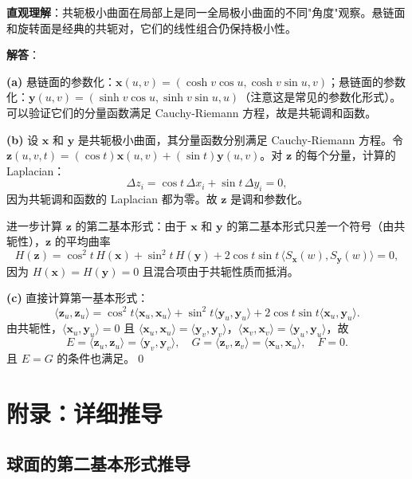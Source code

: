 \begin{solution}
\textbf{直观理解}：共轭极小曲面在局部上是同一全局极小曲面的不同"角度"观察。悬链面和旋转面是经典的共轭对，它们的线性组合仍保持极小性。

\textbf{解答}：

\textbf{(a)} 悬链面的参数化：$\mathbf{x}(u,v) = (\cosh v\cos u, \cosh v\sin u, v)$；悬链面的参数化：$\mathbf{y}(u,v) = (\sinh v\cos u, \sinh v\sin u, u)$（注意这是常见的参数化形式）。可以验证它们的分量函数满足 Cauchy-Riemann 方程，故是共轭调和函数。

\textbf{(b)} 设 $\mathbf{x}$ 和 $\mathbf{y}$ 是共轭极小曲面，其分量函数分别满足 Cauchy-Riemann 方程。令 $\mathbf{z}(u,v,t) = (\cos t)\mathbf{x}(u,v) + (\sin t)\mathbf{y}(u,v)$。对 $\mathbf{z}$ 的每个分量，计算的 Laplacian：
\[
\Delta z_i = \cos t\, \Delta x_i + \sin t\, \Delta y_i = 0,
\]
因为共轭调和函数的 Laplacian 都为零。故 $\mathbf{z}$ 是调和参数化。

进一步计算 $\mathbf{z}$ 的第二基本形式：由于 $\mathbf{x}$ 和 $\mathbf{y}$ 的第二基本形式只差一个符号（由共轭性），$\mathbf{z}$ 的平均曲率
\[
H(\mathbf{z}) = \cos^2 t\, H(\mathbf{x}) + \sin^2 t\, H(\mathbf{y}) + 2\cos t\sin t\, \langle S_{\mathbf{x}}(w), S_{\mathbf{y}}(w)\rangle = 0,
\]
因为 $H(\mathbf{x}) = H(\mathbf{y}) = 0$ 且混合项由于共轭性质而抵消。

\textbf{(c)} 直接计算第一基本形式：
\[
\langle \mathbf{z}_u, \mathbf{z}_u\rangle = \cos^2 t\langle\mathbf{x}_u,\mathbf{x}_u\rangle + \sin^2 t\langle\mathbf{y}_u,\mathbf{y}_u\rangle + 2\cos t\sin t\langle\mathbf{x}_u,\mathbf{y}_u\rangle.
\]
由共轭性，$\langle\mathbf{x}_u,\mathbf{y}_u\rangle = 0$ 且 $\langle\mathbf{x}_u,\mathbf{x}_u\rangle = \langle\mathbf{y}_v,\mathbf{y}_v\rangle$，$\langle\mathbf{x}_v,\mathbf{x}_v\rangle = \langle\mathbf{y}_u,\mathbf{y}_u\rangle$，故
\[
E = \langle\mathbf{z}_u,\mathbf{z}_u\rangle = \langle\mathbf{y}_v,\mathbf{y}_v\rangle,\quad
G = \langle\mathbf{z}_v,\mathbf{z}_v\rangle = \langle\mathbf{x}_u,\mathbf{x}_u\rangle,\quad
F = 0.
\]
且 $E = G$ 的条件也满足。\qed
\end{solution}

\section*{附录：详细推导}\label{sec:ch3-derivations}

\subsection*{球面的第二基本形式推导}\label{sec:ch3-sphere-derivation}

